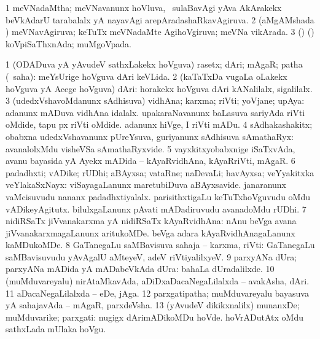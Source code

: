 \bentry
{} 
\gl{\gu}
\bmng
\bnum
\num{1} meVNadaMtha; meVNavanunx hoVluva, \kanmu\ sulaBavAgi yAva AkArakekx beVkAdarU tarabalalx yA nayavAgi arepAradashaRkavAgiruva. 
\num{2} (aMgAMshada \vi) meVNavAgiruva; keTuTx meVNadaMte AgihoVgiruva; meVNa vikArada. 
\num{3} (\birx) (\ashi) koVpiSaThxnAda; muMgoVpada. 
\enum
\emng
\eentry

\bentry
{} 
\gl{\nA}
\expl{}
\bmng
\bnum
\num{1} (ODADuva yA yAvudeV sathxLakekx hoVguva) rasetx; dAri; mAgaR; patha (\rUpa\ saha):  meYsUrige hoVguva dAri keVLida. 
\num{2} (kaTaTxDa \mo vugaLa oLakekx hoVguva yA Acege hoVguva) dAri:  horakekx hoVguva dAri kANalilalx, sigalilalx. 
\num{3} (udedxVshavoMdanunx sAdhisuva) vidhAna; karxma; riVti; yoVjane; upAya:  adanunx mADuva vidhAna idalalx.  upakaraNavanunx baLasuva sariyAda riVti oMdide, tapu px riVti oMdide.  adanunx hiVge, I riVti mADu. 
\num{4} sAdhakashakitx; obabxna udedxVshavanunx pUreYsuva, guriyanunx sAdhisuva sAmathaRyx:  avanalolxMdu visheVSa sAmathaRyxvide. 
\num{5} vayxkitxyobabxnige iSaTxvAda, avanu bayasida yA Ayekx mADida -- kAyaRvidhAna, kAyaRriVti, mAgaR. 
\num{6} padadhxti; vADike; rUDhi; aBAyxsa; vataRne; naDevaLi; havAyxsa; veYyakitxka veYlakaSxNayx:  viSayagaLanunx maretubiDuva aBAyxsavide.  janaranunx vaMcisuvudu nananx padadhxtiyalalx.  parisithxtigaLu keTuTxhoVguvudu oMdu vADikeyAgitutx.  bilulxgaLanunx pAvati mADadiruvudu avanadoMdu rUDhi. 
\num{7} nidiRSaTx jiVvanakarxma yA nidiRSaTx kAyaRvidhAna:  nAnu beVga avana jiVvanakarxmagaLanunx aritukoMDe.  beVga adara kAyaRvidhAnagaLanunx kaMDukoMDe. 
\num{8} GaTanegaLu saMBavisuva sahaja -- karxma, riVti:  GaTanegaLu saMBavisuvudu yAvAgalU aMteyeV, adeV riVtiyalilxyeV. 
\num{9} parxyANa dUra; parxyANa mADida yA mADabeVkAda dUra:  bahaLa dUradalilxde. 
\num{10} (muMduvareyalu) nirAtaMkavAda, aDiDxaDacaNegaLilalxda -- avakAsha, dAri. 
\num{11} aDacaNegaLilalxda -- eDe, jAga. 
\num{12} parxgatipatha; muMduvareyalu bayasuva yA sahajavAda -- mAgaR, parxdeVsha. 
\num{13} (yAvudeV dikikxnalilx) munanxDe; muMduvarike; parxgati:  nugigx dArimADikoMDu hoVde.  hoVrADutAtx oMdu sathxLada mUlaka hoVgu. 
